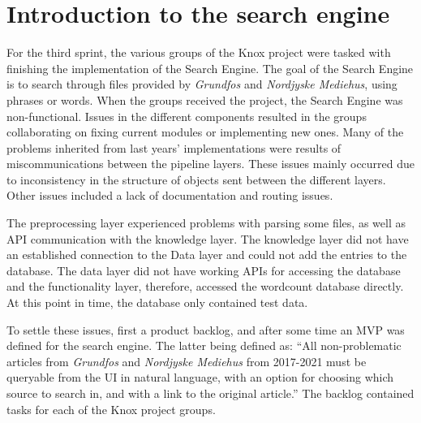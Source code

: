 \chapter{Introduction to the search engine}
For the third sprint, the various groups of the Knox project were tasked with finishing the implementation of the Search Engine. The goal of the Search Engine is to search through files provided by \textit{Grundfos} and \textit{Nordjyske Mediehus}, using phrases or words. When the groups received the project, the Search Engine was non-functional. Issues in the different components resulted in the groups collaborating on fixing current modules or implementing new ones. Many of the problems inherited from last years' implementations were results of miscommunications between the pipeline layers. These issues mainly occurred due to inconsistency in the structure of objects sent between the different layers. Other issues included a lack of documentation and routing issues. 

The preprocessing layer experienced problems with parsing some files, as well as API communication with the knowledge layer. The knowledge layer did not have an established connection to the Data layer and could not  add the entries to the database. The data layer did not have working APIs for accessing the database and the functionality layer, therefore, accessed the wordcount database directly. At this point in time, the database only contained test data.

To settle these issues, first a product backlog, and after some time an MVP was defined for the search engine. The latter being defined as: “All non-problematic articles from \textit{Grundfos} and \textit{Nordjyske Mediehus} from 2017-2021 must be queryable from the UI in natural language, with an option for choosing which source to search in, and with a link to the original article.” 
The backlog contained tasks for each of the Knox project groups.